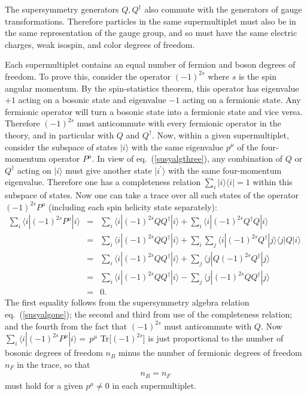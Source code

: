 \documentclass[11pt]{article}
\def\beq{\begin{eqnarray}}
\def\eeq{\end{eqnarray}}
\begin{document}
The supersymmetry generators $Q,Q^\dagger$ also commute with the
generators of gauge transformations. Therefore particles in the same
supermultiplet must also be in the same representation of the gauge group,
and so must have the same electric charges, weak isospin, and color
degrees of freedom. 

Each supermultiplet contains an equal number of fermion and boson degrees
of freedom. To prove this, consider the operator $(-1)^{2s}$ where $s$ is
the spin angular momentum. By the spin-statistics theorem, this operator
has eigenvalue $+1$ acting on a bosonic state and eigenvalue $-1$ acting
on a fermionic state. Any fermionic operator will turn a bosonic state
into a fermionic state and vice versa. Therefore $(-1)^{2s}$ must
anticommute with every fermionic operator in the theory, and in particular
with $Q$ and $Q^\dagger$. Now, within a given supermultiplet, consider the
subspace of states $| i \rangle$ with the same eigenvalue $p^\mu$ of the
four-momentum operator $P^\mu$. In view of eq.~(\ref{susyalgthree}), any
combination of $Q$ or $Q^\dagger$ acting on $|i\rangle$ must give another
state $|i^\prime\rangle$ with the same four-momentum eigenvalue. Therefore
one has a completeness relation $\sum_i |i\rangle\langle i | = 1$ within
this subspace of states. Now one can take a trace over all such states of
the operator $(-1)^{2s} P^\mu$ (including each spin helicity state
separately): 
\beq
\sum_i \langle i | (-1)^{2s} P^\mu | i \rangle
&=&
\sum_i \langle i | (-1)^{2s} Q Q^\dagger|i\rangle
+\sum_i\langle i | (-1)^{2s} Q^\dagger Q | i \rangle
\nonumber\\
&=&
\sum_i \langle i | (-1)^{2s} Q Q^\dagger | i \rangle
+ \sum_i \sum_j \langle i | (-1)^{2s} Q^\dagger |j \rangle \langle j | Q
| i \rangle\qquad{}
\nonumber\\
&=&
\sum_i \langle i | (-1)^{2s} Q Q^\dagger | i \rangle +
\sum_j \langle j | Q (-1)^{2s}  Q^\dagger | j \rangle
\nonumber\\
&=&\sum_i \langle i | (-1)^{2s} Q Q^\dagger | i \rangle -
\sum_j \langle j |  (-1)^{2s} Q Q^\dagger | j \rangle
\nonumber \\
&=& 0.
\eeq
The first equality follows from the supersymmetry algebra relation
eq.~(\ref{susyalgone}); the second and third from use of the completeness
relation; and the fourth from the fact that $(-1)^{2s}$ must anticommute
with $Q$. Now $\sum_i \langle i | (-1)^{2s} P^\mu | i \rangle = \, p^\mu$
Tr[$(-1)^{2s}$] is just proportional to the number of bosonic degrees of
freedom $n_B$ minus the number of fermionic degrees of freedom $n_F$ in
the trace, so that
\beq
n_B= n_F
\label{nbnf}
\eeq
must hold for a given $p^\mu\not= 0$ in each supermultiplet.
\end{document}
